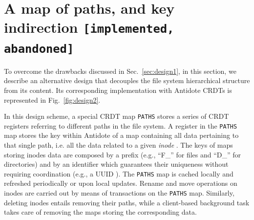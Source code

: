 \documentclass[11pt]{article}
\newcommand{\status}[1]{{\texttt{\footnotesize [#1]}}}
\newcommand{\PATHS}{\texttt{PATHS}\xspace}
\begin{document}


\section{A map of paths, and key indirection \status{implemented, abandoned}}
\label{sec:design2}
To overcome the drawbacks discussed in Sec.~\ref{sec:design1},
in this section, we describe an alternative design that decouples
the file system hierarchical structure from its content.
Its corresponding implementation with Antidote CRDTs is 
represented in Fig.~\ref{fig:design2}.

In this design scheme, a special CRDT map \PATHS stores a 
series of CRDT registers referring to different paths in the file system.
A register in the \PATHS map stores the key within Antidote
of a map containing all data pertaining to that single path, i.e.
all the data related to a given \textit{inode} \cite{posix}.
The keys of maps storing inodes data are composed by a prefix 
(e.g., ``F\_'' for files and ``D\_'' for directories) and by 
an identifier which guarantees their uniqueness without 
requiring coordination (e.g., a UUID \cite{uuid}).
The \PATHS map is cached locally and refreshed periodically
or upon local updates.
Rename and move operations on inodes are carried out by means of transactions 
on the \PATHS map.
Similarly, deleting inodes entails removing their paths, 
while a client-based background task takes care of removing the maps
storing the corresponding data.
\end{document}
